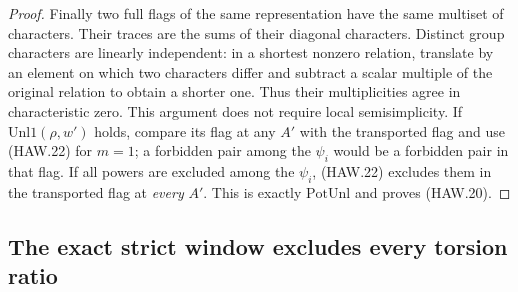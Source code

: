 \begin{proof}
Finally two full flags of the same representation have the
same multiset of characters.  Their traces are the sums of
their diagonal characters.  Distinct group characters are
linearly independent: in a shortest nonzero relation,
translate by an element on which two characters differ and
subtract a scalar multiple of the original relation to
obtain a shorter one.  Thus their multiplicities agree in
characteristic zero.  This argument does not require local
semisimplicity.  If $\mathrm{Unl1}(\rho,w')$ holds, compare
its flag at any $A'$ with the transported flag and use
(HAW.22) for $m=1$; a forbidden pair among the $\psi_i$
would be a forbidden pair in that flag.  If all powers are
excluded among the $\psi_i$, (HAW.22) excludes them in the
transported flag at \emph{every} $A'$.  This is exactly
$\mathrm{PotUnl}$ and proves (HAW.20).
\end{proof}

\subsection{The exact strict window excludes every torsion ratio}

